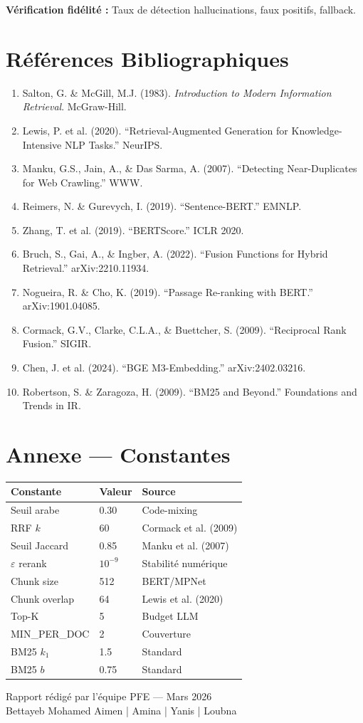 \documentclass[11pt,a4paper]{article}
\begin{document}
\textbf{Vérification fidélité :} Taux de détection hallucinations, faux positifs, fallback.

\section{Références Bibliographiques}

\begin{enumerate}
\item Salton, G. \& McGill, M.J. (1983). \textit{Introduction to Modern Information Retrieval}. McGraw-Hill.
\item Lewis, P. et al. (2020). ``Retrieval-Augmented Generation for Knowledge-Intensive NLP Tasks.'' NeurIPS.
\item Manku, G.S., Jain, A., \& Das Sarma, A. (2007). ``Detecting Near-Duplicates for Web Crawling.'' WWW.
\item Reimers, N. \& Gurevych, I. (2019). ``Sentence-BERT.'' EMNLP.
\item Zhang, T. et al. (2019). ``BERTScore.'' ICLR 2020.
\item Bruch, S., Gai, A., \& Ingber, A. (2022). ``Fusion Functions for Hybrid Retrieval.'' arXiv:2210.11934.
\item Nogueira, R. \& Cho, K. (2019). ``Passage Re-ranking with BERT.'' arXiv:1901.04085.
\item Cormack, G.V., Clarke, C.L.A., \& Buettcher, S. (2009). ``Reciprocal Rank Fusion.'' SIGIR.
\item Chen, J. et al. (2024). ``BGE M3-Embedding.'' arXiv:2402.03216.
\item Robertson, S. \& Zaragoza, H. (2009). ``BM25 and Beyond.'' Foundations and Trends in IR.
\end{enumerate}

\section*{Annexe --- Constantes}

\begin{center}
\begin{tabular}{lll}
\toprule
\textbf{Constante} & \textbf{Valeur} & \textbf{Source} \\
\midrule
Seuil arabe & 0.30 & Code-mixing \\
RRF $k$ & 60 & Cormack et al. (2009) \\
Seuil Jaccard & 0.85 & Manku et al. (2007) \\
$\varepsilon$ rerank & $10^{-9}$ & Stabilité numérique \\
Chunk size & 512 & BERT/MPNet \\
Chunk overlap & 64 & Lewis et al. (2020) \\
Top-K & 5 & Budget LLM \\
MIN\_PER\_DOC & 2 & Couverture \\
BM25 $k_1$ & 1.5 & Standard \\
BM25 $b$ & 0.75 & Standard \\
\bottomrule
\end{tabular}
\end{center}

\vspace{1cm}
\noindent Rapport rédigé par l'équipe PFE --- Mars 2026\\
Bettayeb Mohamed Aimen | Amina | Yanis | Loubna
\end{document}
